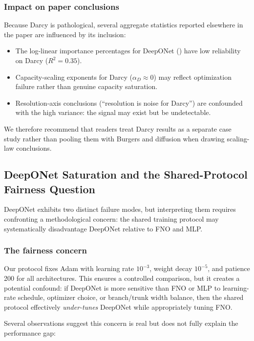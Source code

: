 \documentclass[11pt]{article}
\begin{document}
\subsubsection{Impact on paper conclusions}

Because Darcy is pathological, several aggregate statistics reported
elsewhere in the paper are influenced by its inclusion:
\begin{itemize}[leftmargin=*,itemsep=2pt]
  \item The log-linear importance percentages for DeepONet
    () have low reliability on Darcy ($R^2 = 0.35$).
  \item Capacity-scaling exponents for Darcy ($\alpha_D \approx 0$)
    may reflect optimization failure rather than genuine capacity
    saturation.
  \item Resolution-axis conclusions (``resolution is noise for Darcy'')
    are confounded with the high variance: the signal may exist but
    be undetectable.
\end{itemize}
We therefore recommend that readers treat Darcy results as a
separate case study rather than pooling them with Burgers and
diffusion when drawing scaling-law conclusions.

\subsection{DeepONet Saturation and the Shared-Protocol Fairness Question}
\label{sec:deeponet}

DeepONet exhibits two distinct failure modes, but interpreting them
requires confronting a methodological concern: the shared training
protocol may systematically disadvantage DeepONet relative to FNO
and MLP.

\subsubsection{The fairness concern}

Our protocol fixes Adam with learning rate $10^{-3}$, weight decay
$10^{-5}$, and patience 200 for all architectures. This ensures a
controlled comparison, but it creates a potential confound:
if DeepONet is more sensitive than FNO or MLP to learning-rate
schedule, optimizer choice, or branch/trunk width balance, then
the shared protocol effectively \emph{under-tunes} DeepONet while
appropriately tuning FNO.

Several observations suggest this concern is real but does
not fully explain the performance gap:
\end{document}
